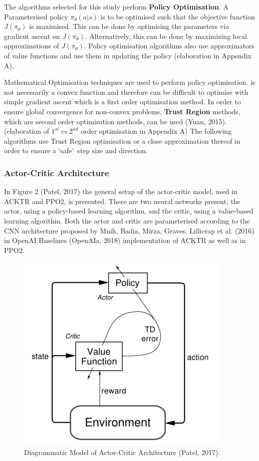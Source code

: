 The algorithms selected for this study perform \textbf{Policy Optimisation}. A Parameterised policy $\pi_{\theta}(a|s) $ is to be optimised such that the objective function $J(\pi_{\theta})$ is maximised. This can be done by optimising the parameters via gradient ascent on $J(\pi_{\theta})$. Alternatively, this can be done by maximizing local approximations of $J(\pi_{\theta})$. Policy optimisation algorithms also use approximators of value functions and use them in updating the policy (elaboration in Appendix A).

Mathematical Optimisation techniques are used to perform policy optimisation. is not necessarily a convex function and therefore can be difficult to optimise with simple gradient ascent which is a first order optimisation method. In order to ensure global convergence for non-convex problems, \textbf{Trust Region} methods, which are second order optimisation methods, can be used (Yuan, 2015). (elaboration of $1^{st} \ vs \ 2^{nd}$ order optimisation in Appendix A)
The following algorithms use Trust Region optimisation or a close approximation thereof in order to ensure a \lq safe\rq \ step size and direction.  


\subsubsection*{Actor-Critic Architecture}
In Figure 2 (Patel, 2017) the general setup of the actor-critic model, used in ACKTR and PPO2, is presented. There are two neural networks present, the actor, using a policy-based learning algorithm, and the critic, using a value-based learning algorithm. Both the actor and critic are parameterised according to the CNN architecture proposed by Mnih, Badia, Mirza, Graves, Lillicrap et al. (2016) in OpenAI Baselines (OpenAIa, 2018) implementation of ACKTR as well as in PPO2.

\begin{figure}[t]
	\includegraphics[width=\columnwidth]{fig2.png} 
	\caption{Diagrammatic Model of Actor-Critic Architecture (Patel, 2017).}
\end{figure}

